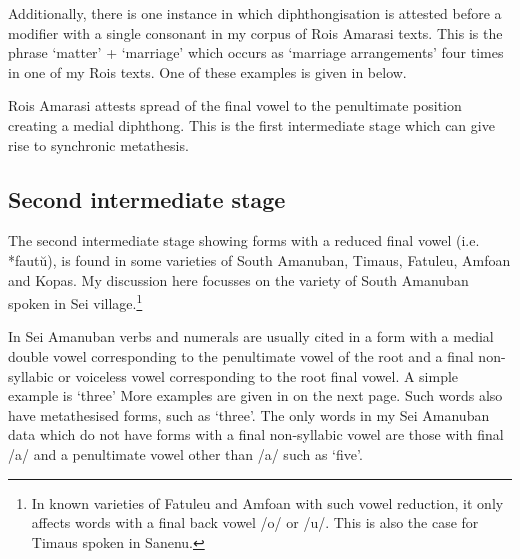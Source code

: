 Additionally, there is one instance in which diphthongisation
is attested before a modifier with a single consonant in my
corpus of Ro{\Q}is Amarasi texts.
This is the phrase  `matter' +  `marriage'
which occurs as  `marriage arrangements' four
times in one of my Ro{\Q}is texts.
One of these examples is given in  below.

\begin{exe}
	\label{ex:RO-170830-1-06-54}
\end{exe}

Ro{\Q}is Amarasi attests spread of the final
vowel to the penultimate position creating a medial
diphthong. This is the first intermediate
stage which can give rise to synchronic metathesis.

\subsection{Second intermediate stage}
The second intermediate stage showing forms with
a reduced final vowel (i.e. *faut\u{u}),
is found in some varieties of South Amanuban,
Timaus, Fatule{\Q}u, Amfo{\Q}an and Kopas.
My discussion here focusses on the variety of
South Amanuban spoken in Se{\Q}i village.\footnote{
		In known varieties of Fatule{\Q}u and Amfo{\Q}an
		with such vowel reduction, it only affects words with a final
		back vowel /o/ or /u/. This is also the case
		for Timaus spoken in Sanenu.}

In Se{\Q}i Amanuban verbs and numerals are usually
cited in a form with a medial double vowel
corresponding to the penultimate vowel of the root
and a final non-syllabic or voiceless vowel
corresponding to the root final vowel.
A simple example is  {\ra}  `three'
More examples are given in  on the next page.
Such words also have metathesised forms,
such as  {\ra}  `three'.
The only words in my Se{\Q}i Amanuban data which do not have
forms with a final non-syllabic vowel are those with final /a/
and a penultimate vowel other than /a/ such as  {\ra}  `five'.


